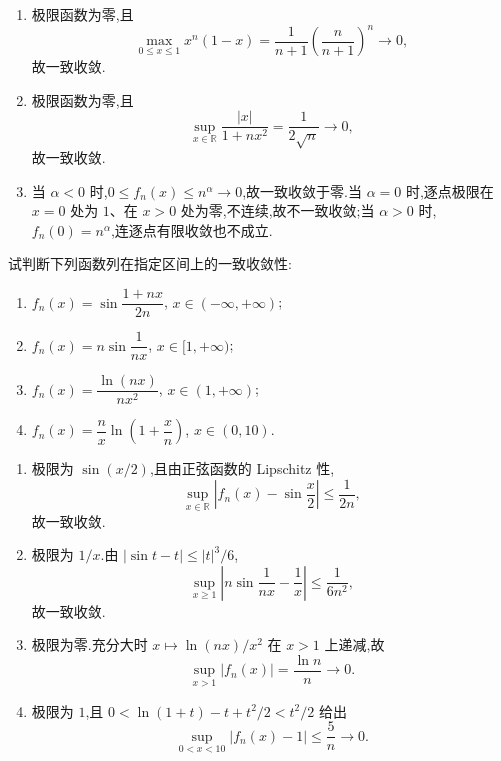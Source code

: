 \begin{solution}
    \begin{enumerate}
        \item 极限函数为零,且
              \[
                  \max_{0\leq x\leq1}x^n(1-x)
                  =\dfrac{1}{n+1}\left(\dfrac{n}{n+1}\right)^n\longrightarrow0,
              \]
              故一致收敛.
        \item 极限函数为零,且
              \[
                  \sup_{x\in\mathbb R}\dfrac{|x|}{1+nx^2}=\dfrac{1}{2\sqrt n}\longrightarrow0,
              \]
              故一致收敛.
        \item 当 $\alpha<0$ 时,$0\leq f_n(x)\leq n^\alpha\to0$,故一致收敛于零.当 $\alpha=0$ 时,逐点极限在 $x=0$ 处为 $1$、在 $x>0$ 处为零,不连续,故不一致收敛;当 $\alpha>0$ 时,$f_n(0)=n^\alpha$,连逐点有限收敛也不成立.
    \end{enumerate}
\end{solution}

\begin{example}
    试判断下列函数列在指定区间上的一致收敛性:
    \begin{enumerate}
        \item $f_n(x)=\sin\dfrac{1+nx}{2n}$, $x\in(-\infty,+\infty)$;
        \item $f_n(x)=n\sin\dfrac{1}{nx}$, $x\in\lbrack 1,+\infty)$;
        \item $f_n(x)=\dfrac{\ln(nx)}{nx^2}$, $x\in(1,+\infty)$;
        \item $f_n(x)=\dfrac{n}{x}\ln\left(1+\dfrac{x}{n}\right)$, $x\in(0,10)$.
    \end{enumerate}
\end{example}
\exampleblank

\begin{solution}
    \begin{enumerate}
        \item 极限为 $\sin(x/2)$,且由正弦函数的 Lipschitz 性,
              \[
                  \sup_{x\in\mathbb R}\left|f_n(x)-\sin\dfrac{x}{2}\right|\leq\dfrac{1}{2n},
              \]
              故一致收敛.
        \item 极限为 $1/x$.由 $|\sin t-t|\leq|t|^3/6$,
              \[
                  \sup_{x\geq1}\left|n\sin\dfrac{1}{nx}-\dfrac{1}{x}\right|
                  \leq\dfrac{1}{6n^2},
              \]
              故一致收敛.
        \item 极限为零.充分大时 $x\mapsto\ln(nx)/x^2$ 在 $x>1$ 上递减,故
              \[
                  \sup_{x>1}|f_n(x)|=\dfrac{\ln n}{n}\longrightarrow0.
              \]
        \item 极限为 $1$,且 $0<\ln(1+t)-t+t^2/2<t^2/2$ 给出
              \[
                  \sup_{0<x<10}|f_n(x)-1|\leq\dfrac{5}{n}\longrightarrow0.
              \]
    \end{enumerate}
\end{solution}

